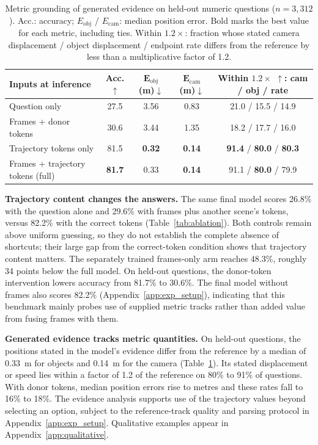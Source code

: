 \begin{table}[t]
\caption{Metric grounding of generated evidence on held-out numeric questions ($n=3{,}312$). Acc.: accuracy; $E_{\mathrm{obj}}$ / $E_{\mathrm{cam}}$: median position error. Bold marks the best value for each metric, including ties. Within $1.2\times$: fraction whose stated camera displacement / object displacement / endpoint rate differs from the reference by less than a multiplicative factor of 1.2.}
\label{tab:evidence}
\begin{center}
\footnotesize
\setlength{\tabcolsep}{3pt}
\begin{tabular}{lcccc}
\toprule
\textbf{Inputs at inference} & \textbf{Acc.}$\uparrow$ & $\boldsymbol{E_{\mathrm{obj}}}$ \textbf{(m)}$\downarrow$ & $\boldsymbol{E_{\mathrm{cam}}}$ \textbf{(m)}$\downarrow$ & \textbf{Within $1.2\times$ $\uparrow$: cam / obj / rate} \\
\midrule
Question only & 27.5 & 3.56 & 0.83 & 21.0 / 15.5 / 14.9 \\
Frames + donor tokens & 30.6 & 3.44 & 1.35 & 18.2 / 17.7 / 16.0 \\
Trajectory tokens only & 81.5 & \textbf{0.32} & \textbf{0.14} & \textbf{91.4} / \textbf{80.0} / \textbf{80.3} \\
Frames + trajectory tokens (full) & \textbf{81.7} & 0.33 & \textbf{0.14} & 91.1 / \textbf{80.0} / 79.9 \\
\bottomrule
\end{tabular}
\end{center}
\end{table}

\textbf{Trajectory content changes the answers.}
The same final model scores 26.8\% with the question alone and 29.6\% with frames plus another scene's tokens, versus 82.2\% with the correct tokens (Table~\ref{tab:ablation}). Both controls remain above uniform guessing, so they do not establish the complete absence of shortcuts; their large gap from the correct-token condition shows that trajectory content matters. The separately trained frames-only arm reaches 48.3\%, roughly 34 points below the full model. On held-out questions, the donor-token intervention lowers accuracy from 81.7\% to 30.6\%. The final model without frames also scores 82.2\% (Appendix~\ref{app:exp_setup}), indicating that this benchmark mainly probes use of supplied metric tracks rather than added value from fusing frames with them.

\textbf{Generated evidence tracks metric quantities.}
On held-out questions, the positions stated in the model's evidence differ from the reference by a median of 0.33~m for objects and 0.14~m for the camera (Table~\ref{tab:evidence}). Its stated displacement or speed lies within a factor of 1.2 of the reference on 80\% to 91\% of questions. With donor tokens, median position errors rise to metres and these rates fall to 16\% to 18\%. The evidence analysis supports use of the trajectory values beyond selecting an option, subject to the reference-track quality and parsing protocol in Appendix~\ref{app:exp_setup}. Qualitative examples appear in Appendix~\ref{app:qualitative}.

